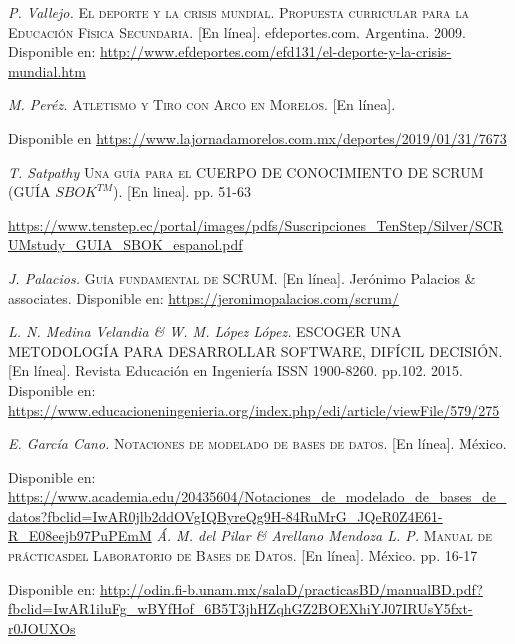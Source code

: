 \begin{thebibliography}{}
	\textit{P. Vallejo.}
	\textsc{El deporte y la crisis mundial. Propuesta curricular para la Educación Física Secundaria.} [En línea]. 
	efdeportes.com. Argentina. 2009.
	Disponible en: 
	\url{http://www.efdeportes.com/efd131/el-deporte-y-la-crisis-mundial.htm}

	\textit{M. Peréz.}
	\textsc{Atletismo y Tiro con Arco en Morelos.} [En línea].
	
	Disponible en 
	\url{https://www.lajornadamorelos.com.mx/deportes/2019/01/31/7673}

	\textit{T. Satpathy}
	\textsc{Una guía para el CUERPO DE CONOCIMIENTO DE SCRUM (GUÍA $SBOK^{TM}$).} [En linea]. pp. 51-63 
	
	\url{https://www.tenstep.ec/portal/images/pdfs/Suscripciones_TenStep/Silver/SCRUMstudy_GUIA_SBOK_espanol.pdf}

	\textit{J. Palacios.}
	\textsc{Guía fundamental de SCRUM.} [En línea]. 
	Jerónimo Palacios \& associates. 
	Disponible en: 
	\url{https://jeronimopalacios.com/scrum/}
	
	\textit{L. N. Medina Velandia \& W. M. López López.}
	\textsc{ESCOGER UNA METODOLOGÍA PARA DESARROLLAR SOFTWARE, DIFÍCIL DECISIÓN.} [En línea]. 
	Revista Educación en Ingeniería ISSN 1900-8260. pp.102. 2015. 
	Disponible en: 
	\url{https://www.educacioneningenieria.org/index.php/edi/article/viewFile/579/275}
	
	\textit{E. García Cano.}
	\textsc{Notaciones de modelado de bases de datos.} [En línea]. México.
	
	Disponible en:
	\url{https://www.academia.edu/20435604/Notaciones_de_modelado_de_bases_de_datos?fbclid=IwAR0jlb2ddOVgIQByreQg9H-84RuMrG_JQeR0Z4E61-R_E08eejb97PuPEmM}
	\textit{Á. M. del Pilar \& Arellano Mendoza L. P.}
	\textsc{Manual de prácticasdel Laboratorio de Bases de Datos.} [En línea]. México. pp. 16-17
	
	Disponible en: 
	\url{http://odin.fi-b.unam.mx/salaD/practicasBD/manualBD.pdf?fbclid=IwAR1iluFg_wBYfHof_6B5T3jhHZqhGZ2BOEXhiYJ07IRUsY5fxt-r0JOUXOs}
	

\end{thebibliography}
